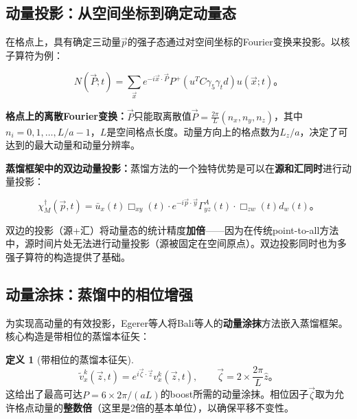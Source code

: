 \documentclass[12pt,a4paper]{ctexart}
\theoremstyle{definition}
\newtheorem{definition}{定义}[section]
\begin{document}
\subsection{动量投影：从空间坐标到确定动量态}

在格点上，具有确定三动量$\vec{p}$的强子态通过对空间坐标的Fourier变换来投影\cite{Peardon2009,Ji2013Euclidean}。以核子算符为例\cite{Chen2025gluon}：

\begin{equation}
\boxed{N(\vec{P}; t) = \sum_{\vec{x}} e^{-i\vec{x}\cdot\vec{P}} P^+ (u^T C\gamma_5\gamma_t d) u(\vec{x}; t)}。
\label{eq:momentum_projection}
\end{equation}

\textbf{格点上的离散Fourier变换：}$\vec{P}$只能取离散值$\vec{P} = \frac{2\pi}{L}(n_x, n_y, n_z)$，其中$n_i = 0, 1, \ldots, L/a - 1$，$L$是空间格点长度。动量方向上的格点数为$L_z/a$，决定了可达到的最大动量和动量分辨率。

\textbf{蒸馏框架中的双边动量投影：}蒸馏方法的一个独特优势是可以在\textbf{源和汇同时}进行动量投影\cite{Peardon2009,Egerer2021a}：

\begin{equation}
\chi^\dagger_M(\vec{p}, t) = \bar{u}_x(t) \Box_{xy}(t) \cdot e^{-i\vec{p}\cdot\vec{y}} \Gamma^A_{yz}(t) \cdot \Box_{zw}(t) d_w(t)。
\label{eq:double_momentum_proj}
\end{equation}

双边的投影（源+汇）将动量态的统计精度\textbf{加倍}——因为在传统point-to-all方法中，源时间片处无法进行动量投影（源被固定在空间原点）。双边投影同时也为多强子算符的构造提供了基础\cite{Peardon2009}。

\subsection{动量涂抹：蒸馏中的相位增强}

为实现高动量的有效投影，Egerer等人将Bali等人的\textbf{动量涂抹}方法嵌入蒸馏框架\cite{Egerer2021a}。核心构造是带相位的蒸馏本征矢\cite{Egerer2021a,NoteGluonPDFs}：

\begin{definition}[带相位的蒸馏本征矢]
\begin{equation}
\boxed{\tilde{v}^k_x(\vec{z}, t) = e^{i\vec{\zeta}\cdot\vec{z}} v^k_x(\vec{z}, t)}, \qquad \vec{\zeta} = 2 \times \frac{2\pi}{L} \hat{z}。
\label{eq:phased_distillation}
\end{equation}
这给出了最高可达$P = 6 \times 2\pi/(aL)$的boost所需的动量涂抹\cite{NoteGluonPDFs}。相位因子$\vec{\zeta}$取为允许格点动量的\textbf{整数倍}（这里是2倍的基本单位），以确保平移不变性。
\end{definition}
\end{document}
